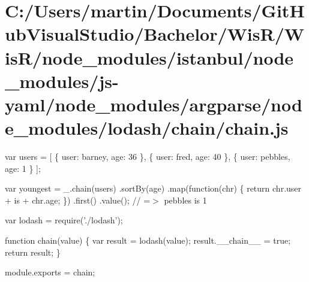 \hypertarget{_c_1_2_users_2martin_2_documents_2_git_hub_visual_studio_2_bachelor_2_wis_r_2_wis_r_2node_modulea05ee6bf27c85b768adae17af6f4190c}{}\section{C\+:/\+Users/martin/\+Documents/\+Git\+Hub\+Visual\+Studio/\+Bachelor/\+Wis\+R/\+Wis\+R/node\+\_\+modules/istanbul/node\+\_\+modules/js-\/yaml/node\+\_\+modules/argparse/node\+\_\+modules/lodash/chain/chain.\+js}
var users = \mbox{[} \{ \textquotesingle{}user\textquotesingle{}\+: \textquotesingle{}barney\textquotesingle{}, \textquotesingle{}age\textquotesingle{}\+: 36 \}, \{ \textquotesingle{}user\textquotesingle{}\+: \textquotesingle{}fred\textquotesingle{}, \textquotesingle{}age\textquotesingle{}\+: 40 \}, \{ \textquotesingle{}user\textquotesingle{}\+: \textquotesingle{}pebbles\textquotesingle{}, \textquotesingle{}age\textquotesingle{}\+: 1 \} \mbox{]};

var youngest = \+\_\+.\+chain(users) .sort\+By(\textquotesingle{}age\textquotesingle{}) .map(function(chr) \{ return chr.\+user + \textquotesingle{} is \textquotesingle{} + chr.\+age; \}) .first() .value(); // =$>$ \textquotesingle{}pebbles is 1\textquotesingle{}


\begin{DoxyCodeInclude}
var lodash = require(\textcolor{stringliteral}{'./lodash'});

\textcolor{keyword}{function} chain(value) \{
  var result = lodash(value);
  result.\_\_chain\_\_ = \textcolor{keyword}{true};
  \textcolor{keywordflow}{return} result;
\}

module.exports = chain;
\end{DoxyCodeInclude}
 